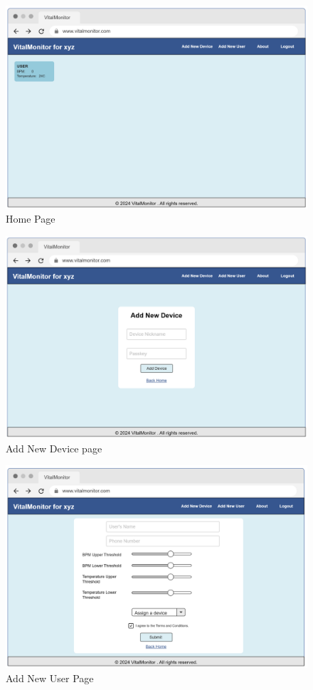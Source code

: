 \begin{figure}[!h]
    \centering
    \includegraphics[width=0.87\linewidth]{images/home.png}
    \caption{Home Page}
    \label{fig:wf-3}
\end{figure}

\begin{figure}[!h]
    \centering
    \includegraphics[width=0.9\linewidth]{images/Addnewdevice.png}
    \caption{Add New Device page}
    \label{fig:wf-1}
\end{figure}
\begin{figure}[!h]
    \centering
    \includegraphics[width=0.9\linewidth]{images/addnewuser.png}
    \caption{Add New User Page}
    \label{fig:wf-2}
\end{figure}

